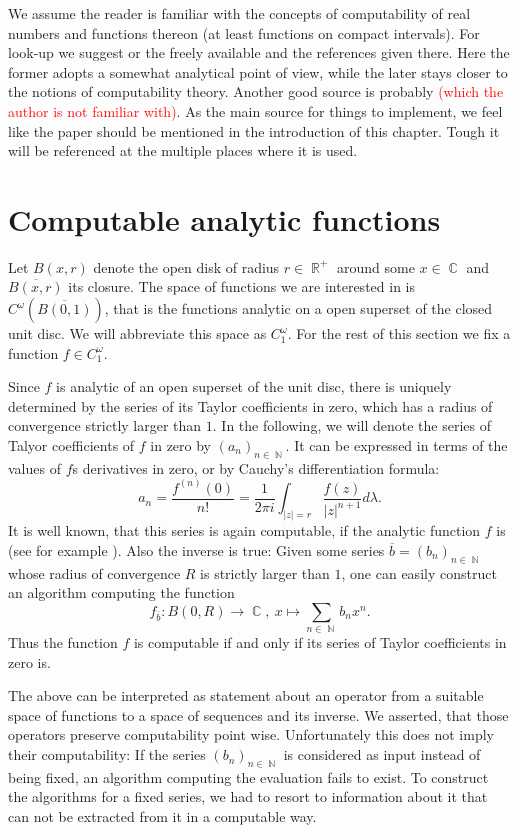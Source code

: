 \documentclass{article}
\DeclareMathOperator{\NN}{\ensuremath{\mathbb{N}}\xspace}
\DeclareMathOperator{\RR}{\ensuremath{\mathbb{R}}\xspace}
\DeclareMathOperator{\CC}{\ensuremath{\mathbb{C}}\xspace}
\newcommand{\temp}[1]{\textcolor{red}{#1}}
\begin{document}
We assume the reader is familiar with the concepts of computability of real numbers and functions thereon (at least functions on compact intervals). For look-up we suggest \cite{MR1005942} or the freely available \cite{MR2762094} and the references given there. Here the former adopts a somewhat analytical point of view, while the later stays closer to the notions of computability theory. Another good source is probably \cite{MR1795407} \temp{(which the author is not familiar with)}. As the main source for things to implement, we feel like the paper \cite{gevrey} should be mentioned in the introduction of this chapter. Tough it will be referenced at the multiple places where it is used.

\section{Computable analytic functions}

Let $B(x,r)$ denote the open disk of radius $r\in\RR^+$ around some $x\in \CC$ and $\overline{B(x,r)}$ its closure. The space of functions we are interested in is $C^\omega(\overline{B(0,1)})$, that is the functions analytic on a open superset of the closed unit disc. We will abbreviate this space as $C^\omega_1$. For the rest of this section we fix a function $f\in C^\omega_1$.

Since $f$ is analytic of an open superset of the unit disc, there is uniquely determined by the series of its Taylor coefficients in zero, which has a radius of convergence strictly larger than $1$. In the following, we will denote the series of Talyor coefficients of $f$ in zero by $(a_n)_{n\in \NN}$. It can be expressed in terms of the values of $f$s derivatives in zero, or by Cauchy's differentiation formula:
\[ a_n = \frac{f^{(n)}(0)}{n!} = \frac 1 {2\pi i}\int_{|z| = r} \frac{f(z)}{|z|^{n+1}} d\lambda. \]
It is well known, that this series is again computable, if the analytic function $f$ is (see for example \cite[Chapter 1.2, Proposition 1]{MR1005942}). Also the inverse is true: Given some series $\overline b = (b_n)_{n\in \NN}$ whose radius of convergence $R$ is strictly larger than $1$, one can easily construct an algorithm computing the function
\[ f_{\overline b}: B(0,R) \to \CC, ~ x\mapsto \sum_{n\in \NN} b_n x^n. \]
Thus the function $f$ is computable if and only if its series of Taylor coefficients in zero is.

The above can be interpreted as statement about an operator from a suitable space of functions to a space of sequences and its inverse. We asserted, that those operators preserve computability point wise. Unfortunately this does not imply their computability: If the series $(b_n)_{n\in \NN}$ is considered as input instead of being fixed, an algorithm computing the evaluation fails to exist. To construct the algorithms for a fixed series, we had to resort to information about it that can not be extracted from it in a computable way.
\end{document}
